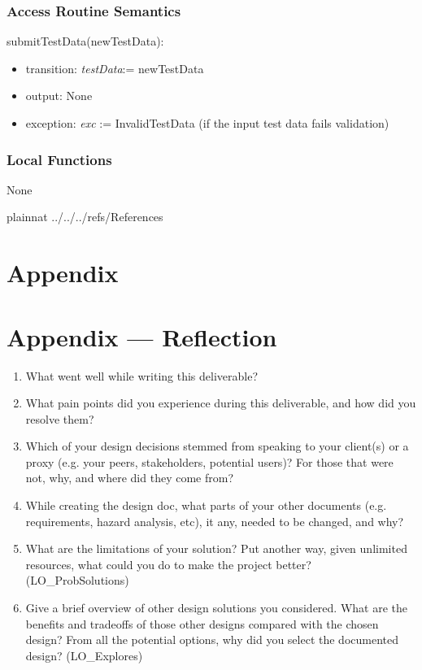 \documentclass[12pt, titlepage]{article}
\begin{document}
\subsubsection{Access Routine Semantics}

\noindent submitTestData(newTestData):
\begin{itemize}
\item transition: \textit{testData}:= newTestData
\item output: None
\item exception: \textit{exc} := InvalidTestData (if the input test data fails validation)
\end{itemize}

\subsubsection{Local Functions}

None

\newpage


 {plainnat}
 {../../../refs/References}

\newpage

\section{Appendix} \label{Appendix}

\section*{Appendix --- Reflection}

\begin{enumerate}
  \item What went well while writing this deliverable? 
  \item What pain points did you experience during this deliverable, and how
    did you resolve them?
  \item Which of your design decisions stemmed from speaking to your client(s)
  or a proxy (e.g. your peers, stakeholders, potential users)? For those that
  were not, why, and where did they come from?
  \item While creating the design doc, what parts of your other documents (e.g.
  requirements, hazard analysis, etc), it any, needed to be changed, and why?
  \item What are the limitations of your solution?  Put another way, given
  unlimited resources, what could you do to make the project better? (LO\_ProbSolutions)
  \item Give a brief overview of other design solutions you considered.  What
  are the benefits and tradeoffs of those other designs compared with the chosen
  design?  From all the potential options, why did you select the documented design?
  (LO\_Explores)
\end{enumerate}
\end{document}
